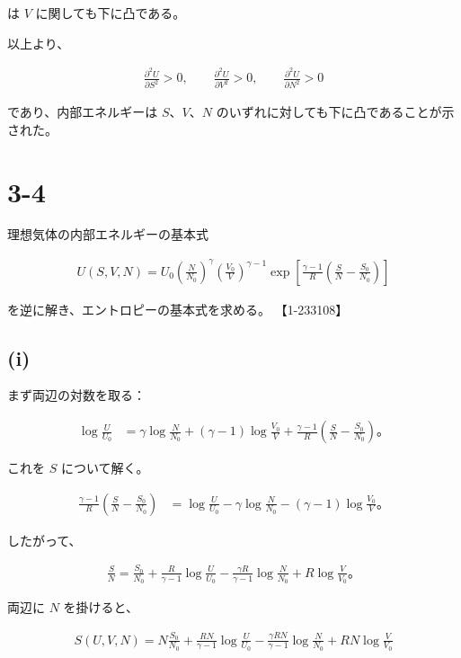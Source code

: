 \documentclass[platex,dvipdfmx,a4paper]{jsarticle}
\begin{document}
は $V$ に関しても下に凸である。

以上より、

\begin{align*}
\frac{\partial^2U}{\partial S^2}>0,
\qquad
\frac{\partial^2U}{\partial V^2}>0,
\qquad
\frac{\partial^2U}{\partial N^2}>0
\end{align*}

であり、内部エネルギーは $S$、$V$、$N$ のいずれに対しても下に凸であることが示された。
\section{3-4}

理想気体の内部エネルギーの基本式

\begin{align*}
U(S,V,N)
=
U_0
\left(
\frac{N}{N_0}
\right)^\gamma
\left(
\frac{V_0}{V}
\right)^{\gamma-1}
\exp\left[
\frac{\gamma-1}{R}
\left(
\frac{S}{N}
-\frac{S_0}{N_0}
\right)
\right]
\end{align*}

を逆に解き、エントロピーの基本式を求める。 【1-233108】

\subsection{(i)}

まず両辺の対数を取る：

\begin{align*}
\log\frac{U}{U_0}
&=
\gamma\log\frac{N}{N_0}
+
(\gamma-1)\log\frac{V_0}{V}
+
\frac{\gamma-1}{R}
\left(
\frac{S}{N}
-
\frac{S_0}{N_0}
\right)。
\end{align*}

これを $S$ について解く。

\begin{align*}
\frac{\gamma-1}{R}
\left(
\frac{S}{N}
-
\frac{S_0}{N_0}
\right)
&=
\log\frac{U}{U_0}
-\gamma\log\frac{N}{N_0}
-(\gamma-1)\log\frac{V_0}{V}。
\end{align*}

したがって、

\begin{align*}
\frac{S}{N}
=
\frac{S_0}{N_0}
+
\frac{R}{\gamma-1}
\log\frac{U}{U_0}
-
\frac{\gamma R}{\gamma-1}
\log\frac{N}{N_0}
+
R\log\frac{V}{V_0}。
\end{align*}

両辺に $N$ を掛けると、

\begin{align*}
S(U,V,N)
=
N\frac{S_0}{N_0}
+
\frac{RN}{\gamma-1}
\log\frac{U}{U_0}
-
\frac{\gamma RN}{\gamma-1}
\log\frac{N}{N_0}
+
RN\log\frac{V}{V_0}
\end{align*}
\end{document}
